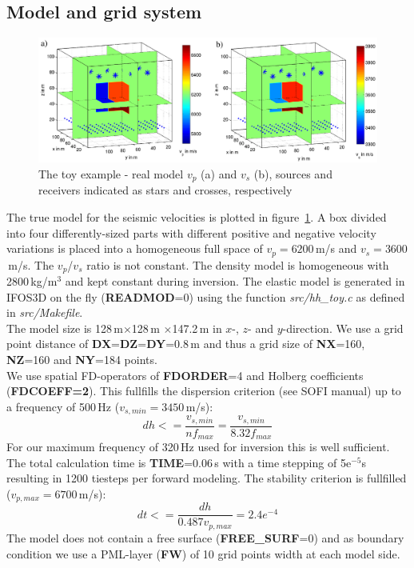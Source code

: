 \subsection{Model and grid system}
\begin{figure}[h!]
\begin{center}
\includegraphics[width=\textwidth]{fig_toy/toy_real_model}
\caption[Toy example - the real model and acquisition geometry]{The toy example - real model $v_p$ (a) and $v_s$ (b), sources and receivers indicated as stars and crosses, respectively}\label{fig:toy_model}
\end{center}
\end{figure}
The true model for the seismic velocities is plotted in figure~\ref{fig:toy_model}. A box divided into four differently-sized parts with different positive and negative velocity variations is placed into a homogeneous full space of $v_p=6200$\,m/s and $v_s=3600$\,m/s. The $v_p$/$v_s$ ratio is not constant.
The density model is homogeneous with 2800\,kg/m$^3$ and kept constant during inversion. The elastic model is generated in IFOS3D on the fly (\textbf{READMOD}=0) using the function \textit{src/hh\_toy.c} as defined in \textit{src/Makefile}.\\
The model size is 128\,m$\times$128\,m $\times$147.2\,m in $x$-, $z$- and $y$-direction. We use a grid point distance of \textbf{DX}=\textbf{DZ}=\textbf{DY}=0.8\,m and thus a grid size of \textbf{NX}=160, \textbf{NZ}=160 and \textbf{NY}=184 points. \\
We use spatial FD-operators of \textbf{FDORDER}=4 and Holberg coefficients (\textbf{FDCOEFF=2}). This fullfills the dispersion criterion (see SOFI manual) up to a frequency of 500\,Hz ($v_{s,min}=3450$\,m/s):
\begin{equation}
 dh <= \frac{v_{s,min}}{nf_{max}}=\frac{v_{s,min}}{8.32f_{max}}
\end{equation}
For our maximum frequency of 320\,Hz used for inversion this is well sufficient. \\
The total calculation time is \textbf{TIME}=0.06\,s with a time stepping of 5e$^{-5}$s resulting in 1200 tiesteps per forward modeling. The stability criterion is fullfilled ($v_{p,max}=6700$\,m/s):
\begin{equation}
 dt<=\frac{dh}{0.487v_{p,max}}=2.4e^{-4}
\end{equation}
The model does not contain a free surface (\textbf{FREE\_SURF}=0) and as boundary condition we use a PML-layer (\textbf{FW}) of 10 grid points width at each model side.\\
